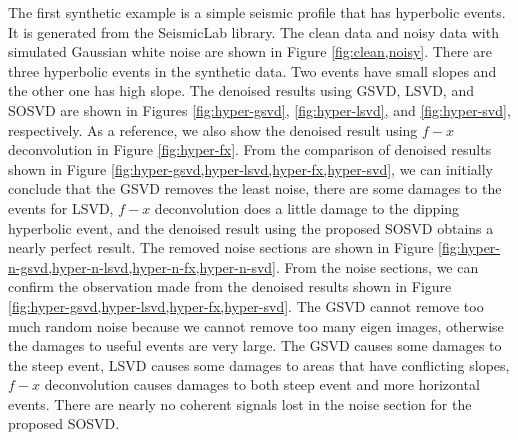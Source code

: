 The first synthetic example is a simple seismic profile that has hyperbolic events. It is generated from the SeismicLab library. The clean data and noisy data with simulated Gaussian white noise are shown in Figure \ref{fig:clean,noisy}. There are three hyperbolic events in the synthetic data. Two events have small slopes and the other one has high slope. The denoised results using GSVD, LSVD, and SOSVD are shown in Figures \ref{fig:hyper-gsvd}, \ref{fig:hyper-lsvd}, and \ref{fig:hyper-svd}, respectively. As a reference, we also show the denoised result using $f-x$ deconvolution in Figure \ref{fig:hyper-fx}. From the comparison of denoised results shown in Figure \ref{fig:hyper-gsvd,hyper-lsvd,hyper-fx,hyper-svd}, we can initially conclude that the GSVD removes the least noise, there are some damages to the events for LSVD, $f-x$ deconvolution does a little damage to the dipping hyperbolic event, and the denoised result using the proposed SOSVD obtains a nearly perfect result. The removed noise sections are shown in Figure \ref{fig:hyper-n-gsvd,hyper-n-lsvd,hyper-n-fx,hyper-n-svd}. From the noise sections, we can confirm the observation made from the denoised results shown in Figure \ref{fig:hyper-gsvd,hyper-lsvd,hyper-fx,hyper-svd}. The GSVD cannot remove too much random noise because we cannot remove too many eigen images, otherwise the damages to useful events are very large. The GSVD causes some damages to the steep event, LSVD causes some damages to areas that have conflicting slopes, $f-x$ deconvolution causes damages to both steep event and more horizontal events. There are nearly no coherent signals lost in the noise section for the proposed SOSVD.


